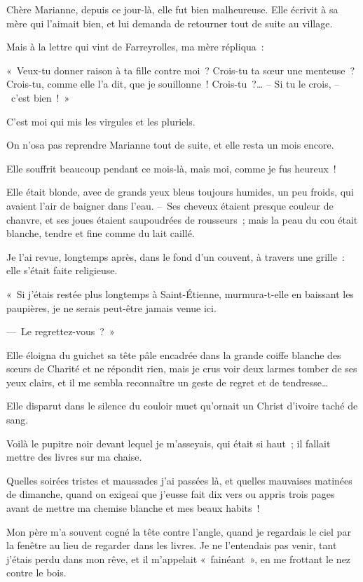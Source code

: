 \documentclass[french,twoside]{book} %
\begin{document}
\bigbreak
\noindent Chère Marianne, depuis ce jour-là, elle fut bien malheureuse. Elle écrivit à sa mère qui l’aimait bien, et lui demanda de retourner tout de suite au village.\par
Mais à la lettre qui vint de Farreyrolles, ma mère répliqua :\par
« Veux-tu donner raison à ta fille contre moi ? Crois-tu ta sœur une menteuse ? Crois-tu, comme elle l’a dit, que je souillonne ! Crois-tu ?… – Si tu le crois, – c’est bien ! »\par
C’est moi qui mis les virgules et les pluriels.\par
On n’osa pas reprendre Marianne tout de suite, et elle resta un mois encore.\par
Elle souffrit beaucoup pendant ce mois-là, mais moi, comme je fus heureux !\par
Elle était blonde, avec de grands yeux bleus toujours humides, un peu froids, qui avaient l’air de baigner dans l’eau. – Ses cheveux étaient presque couleur de chanvre, et ses joues étaient saupoudrées de rousseurs ; mais la peau du cou était blanche, tendre et fine comme du lait caillé.\par
Je l’ai revue, longtemps après, dans le fond d’un couvent, à travers une grille : elle s’était faite religieuse.\par
« Si j’étais restée plus longtemps à Saint-Étienne, murmura-t-elle en baissant les paupières, je ne serais peut-être jamais venue ici.\par
— Le regrettez-vous ? »\par
Elle éloigna du guichet sa tête pâle encadrée dans la grande coiffe blanche des sœurs de Charité et ne répondit rien, mais je crus voir deux larmes tomber de ses yeux clairs, et il me sembla reconnaître un geste de regret et de tendresse…\par
Elle disparut dans le silence du couloir muet qu’ornait un Christ d’ivoire taché de sang.\par
\bigbreak
\noindent Voilà le pupitre noir devant lequel je m’asseyais, qui était si haut ; il fallait mettre des livres sur ma chaise.\par
Quelles soirées tristes et maussades j’ai passées là, et quelles mauvaises matinées de dimanche, quand on exigeai que j’eusse fait dix vers ou appris trois pages avant de mettre ma chemise blanche et mes beaux habits !\par
Mon père m’a souvent cogné la tête contre l’angle, quand je regardais le ciel par la fenêtre au lieu de regarder dans les livres. Je ne l’entendais pas venir, tant j’étais perdu dans mon rêve, et il m’appelait « fainéant », en me frottant le nez contre le bois.\par
\end{document}

